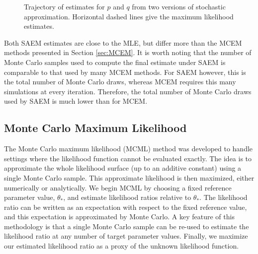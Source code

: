 \documentclass[ss]{imsart}
\theoremstyle{plain}
\theoremstyle{definition}
\theoremstyle{remark}
\begin{document}
\begin{figure}
    \centering
    \caption{Trajectory of estimates for $p$ and $q$ from two versions of stochastic approximation. Horizontal dashed lines give the maximum likelihood estimates.}

    
    \label{fig:blood_SAEM_traj}
\end{figure}


Both SAEM estimates are close to the MLE, but differ more than the MCEM methods presented in Section \ref{sec:MCEM}. It is worth noting that the number of Monte Carlo samples used to compute the final estimate under SAEM is comparable to that used by many MCEM methods. For SAEM however, this is the total number of Monte Carlo draws, whereas MCEM requires this many simulations at every iteration. Therefore, the total number of Monte Carlo draws used by SAEM is much lower than for MCEM.




\subsection{Monte Carlo Maximum Likelihood}
\label{sec:MCML}

The Monte Carlo maximum likelihood (MCML) method was developed to handle settings where the likelihood function cannot be evaluated exactly. The idea is to approximate the whole likelihood surface (up to an additive constant) using a single Monte Carlo sample. This approximate likelihood is then maximized, either numerically or analytically. We begin MCML by choosing a fixed reference parameter value, $\theta_*$, and estimate likelihood ratios relative to $\theta_*$. The likelihood ratio can be written as an expectation with respect to the fixed reference value, and this expectation is approximated by Monte Carlo. A key feature of this methodology is that a single Monte Carlo sample can be re-used to estimate the likelihood ratio at any number of target parameter values. Finally, we maximize our estimated likelihood ratio as a proxy of the unknown likelihood function.
\end{document}

